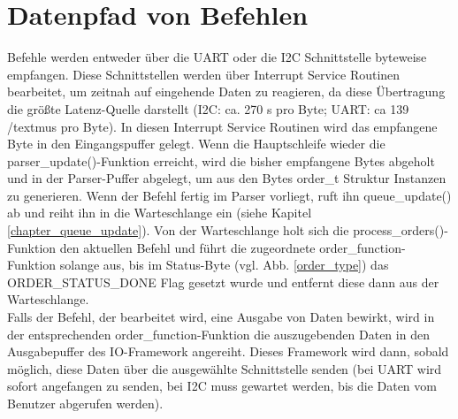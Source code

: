 \section{Datenpfad von Befehlen}
Befehle werden entweder über die UART oder die I2C Schnittstelle byteweise empfangen. Diese Schnittstellen werden über
Interrupt Service Routinen bearbeitet, um zeitnah auf eingehende Daten zu reagieren, da diese Übertragung die größte
Latenz-Quelle darstellt (I2C: ca. 270 \textmu{}s pro Byte; UART: ca 139 /textmu{}s pro Byte). In diesen Interrupt Service Routinen wird
das empfangene Byte in den Eingangspuffer gelegt. Wenn die Hauptschleife wieder die parser\_\-update()-Funktion erreicht,
wird die bisher empfangene Bytes abgeholt und in der Parser-Puffer abgelegt, um aus den Bytes order\_t Struktur Instanzen
zu generieren. Wenn der Befehl fertig im Parser vorliegt, ruft ihn queue\_\-update() ab und reiht ihn in die Warteschlange
ein (siehe Kapitel \ref{chapter_queue_update}). Von der Warteschlange holt sich die process\_\-orders()-Funktion den
aktuellen Befehl und führt die zugeordnete order\_function-Funktion solange aus, bis im Status-Byte (vgl. Abb. \ref{order_type})
das ORDER\_\-STATUS\_\-DONE Flag gesetzt wurde und entfernt diese dann aus der Warteschlange.\\
Falls der Befehl, der bearbeitet wird, eine Ausgabe von Daten bewirkt, wird in der entsprechenden order\_\-function-Funktion
die auszugebenden Daten in den Ausgabepuffer des IO-Framework angereiht. Dieses Framework wird dann, sobald möglich, diese Daten
über die ausgewählte Schnittstelle senden (bei UART wird sofort angefangen zu senden, bei I2C muss gewartet werden, bis die Daten
vom Benutzer abgerufen werden).

